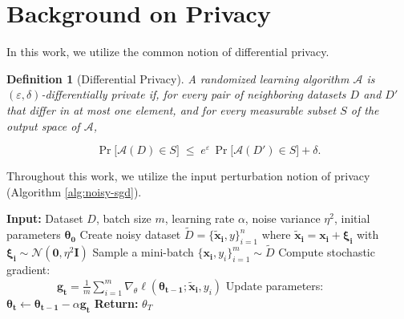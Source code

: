 \documentclass[11pt,letterpaper]{article}
\newtheorem{definition}{Definition}
\begin{document}
\renewcommand{\thesection}
{\Alph{section}}
\setcounter{section}{0}



\section{Background on Privacy} \label{sec:fairpriv}


\setcounter{figure}{0}

\setcounter{theorem}{0}






In this work, we utilize the common notion of differential privacy.

\begin{definition} [Differential Privacy]
    A randomized learning algorithm \(\mathcal{A}\) is \((\varepsilon,\delta)\)-differentially private if, for every pair of neighboring datasets \(D\) and \(D'\) that differ in at most one element, and for every measurable subset \(S\) of the output space of \(\mathcal{A}\),
    
\begin{equation}
\Pr\!\bigl[\mathcal{A}(D) \in S\bigr]
\;\le\;
e^{\varepsilon}\,
\Pr\!\bigl[\mathcal{A}(D') \in S\bigr]
+
\delta.
\end{equation}
\end{definition}


Throughout this work, we utilize the input perturbation notion of privacy (Algorithm \ref{alg:noisy-sgd}). 


\begin{algorithm}[h]
\caption{SGD with Gaussian Input Perturbation }
\label{alg:noisy-sgd}
\begin{algorithmic}[1]
\State \textbf{Input:} Dataset $D$, batch size $m$, learning rate $\alpha$, noise variance $\eta^2$, initial parameters $\bm{\theta_0}$
\State Create noisy dataset $\widetilde{D} =\{\mathbf{\tilde{x}_i}, y\}_{i=1}^n$ where $\mathbf{\tilde{x}_i} = \mathbf{x_i} + \bm{\xi_i}$ with $\bm{\xi_i} \sim \mathcal{N}(\bm{0}, \eta^2 \mathbf{I})$
    \State Sample a mini-batch $\{\mathbf{x_i}, y_i\}_{i=1}^m \sim \widetilde{D}$
    \State Compute stochastic gradient: \\
    ~~~~~~~~~$\mathbf{g_t} = \frac{1}{m} \sum_{i=1}^m \nabla_\theta \ell(\bm{\theta_{t-1}}; \mathbf{\tilde{x}_i}, y_i)$
    \State Update parameters: $\bm{\theta_t} \gets \bm{\theta_{t-1}} - \alpha \mathbf{g_t}$
\EndFor
\State \textbf{Return:} $\theta_T$
\end{algorithmic}
\end{algorithm}
\end{document}
